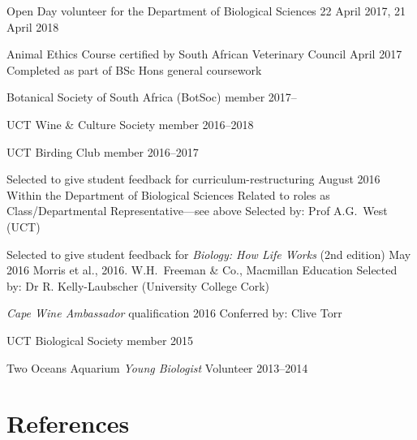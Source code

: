 \documentclass[10pt]{article}
\begin{document}
\begin{hangparas}{2em}{1}

Open Day volunteer for the Department of Biological Sciences
                                    \hfill 22 April 2017, 21 April 2018

Animal Ethics Course certified by South African Veterinary Council
                                                        \hfill April 2017 \break
Completed as part of BSc Hons general coursework

Botanical Society of South Africa (BotSoc) member         \hfill 2017--

UCT Wine \& Culture Society member                    \hfill 2016--2018

UCT Birding Club member                               \hfill 2016--2017

Selected to give student feedback for curriculum-restructuring
                                              \hfill August 2016 \break
Within the Department of Biological Sciences \break
Related to roles as Class/Departmental Representative---see above \break
Selected by: Prof A.G.~West (UCT)

Selected to give student feedback for \textit{Biology: How Life Works} (2nd 
edition)                                         \hfill May 2016 \break
Morris et al., 2016. W.H.~Freeman \& Co., Macmillan Education \break
Selected by: Dr R. Kelly-Laubscher (University College Cork)

\textit{Cape Wine Ambassador} qualification          \hfill 2016 \break
Conferred by: Clive Torr

UCT Biological Society member                               \hfill 2015

Two Oceans Aquarium \textit{Young Biologist} Volunteer \hfill 2013--2014

\hfill

\end{hangparas}

\section*{References} %
\end{document}
